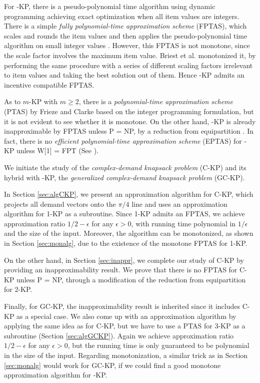 \documentclass{aamas2013}
\begin{document}
For {-KP}, there is a pseudo-polynomial time algorithm using dynamic programming achieving exact optimization when all item values are integers.  There is a simple {\em fully polynomial-time approximation scheme} (FPTAS), which scales and rounds the item values and then applies the pseudo-polynomial time algorithm on small integer values \cite{KPP10book}.  However, this FPTAS is not monotone, since the scale factor involves the maximum item value.  Briest et al. \cite{BKV05KS} monotonized it, by performing the same procedure with a series of different scaling factors irrelevant to item values and taking the best solution out of them.  Hence {-KP} admits an incentive compatible FPTAS.       

As to {\sc $m$-KP} with $m\geq 2$, there is a {\em polynomial-time approximation scheme} (PTAS) by Frieze and Clarke \cite{FC84alg} based on the integer programming formulation, but it is not evident to see whether it is monotone.  On the other hand, {-KP} is already inapproximable by FPTAS unless P = NP, by a reduction from {\sc equipartition} \cite{KPP10book}.  In fact, there is no {\em efficient polynomial-time approximation scheme} (EPTAS) for {-KP} unless W[1] = FPT (See \cite{kulik2010there}).
 
\smallskip

We initiate the study of the {\em complex-demand knapsack problem} ({\sc C-KP}) and its hybrid with {-KP}, the {\em generalized complex-demand knapsack problem} ({\sc GC-KP}).

In Section \ref{sec:algCKP}, we present an approximation algorithm for C-KP, which projects all demand vectors onto the $\pi/4$ line and uses an approximation algorithm for 1-KP as a subroutine.  Since 1-KP admits an FPTAS, we achieve approximation ratio $1/2-\epsilon$ for any $\epsilon>0$, with running time polynomial in $1/\epsilon$ and the size of the input.  Moreover, the algorithm can be monotonized, as shown in Section \ref{sec:monalg}, due to the existence of the monotone FPTAS for 1-KP.  


On the other hand, in Section \ref{sec:inappr}, we complete our study of C-KP by providing an inapproximability result.  We prove that there is no FPTAS for C-KP unless P = NP, through a modification of the reduction from {\sc equipartition} for 2-KP.  

Finally, for GC-KP, the inapproximability result is inherited since it includes C-KP as a special case.  We also come up with an approximation algorithm by applying the same idea as for C-KP, but we have to use a PTAS for 3-KP as a subroutine (Section \ref{sec:algGCKP}). Again we achieve approximation ratio $1/2-\epsilon$ for any $\epsilon>0$, but the running time is only guaranteed to be polynomial in the size of the input.   
Regarding monotonization, a similar trick as in Section \ref{sec:monalg} would work for {\sc GC-KP}, if we could find a good monotone approximation algorithm for {-KP}.
\end{document}
